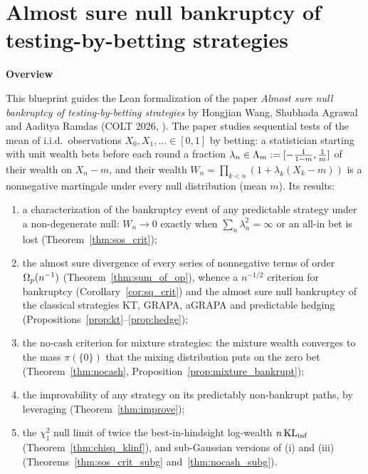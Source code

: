 
\part{Almost sure null bankruptcy of testing-by-betting strategies}
\label{part:main}

\textbf{Overview}

This blueprint guides the Lean formalization of the paper \emph{Almost sure null bankruptcy of
testing-by-betting strategies} by Hongjian Wang, Shubhada Agrawal and Aaditya Ramdas (COLT 2026,
\cite{wang2026almost}). The paper studies sequential tests of the mean of i.i.d.\ observations
$X_0, X_1, \dots \in [0,1]$ by betting: a statistician starting with unit wealth bets before each
round a fraction $\lambda_n \in \Lambda_m := [-\frac{1}{1-m}, \frac1m]$ of their wealth on $X_n - m$,
and their wealth $W_n = \prod_{k < n} (1 + \lambda_k (X_k - m))$ is a nonnegative martingale under
every null distribution (mean $m$). Its results:
\begin{enumerate}
  \item[(i)] a characterization of the bankruptcy event of any predictable strategy under a
        non-degenerate null: $W_n \to 0$ exactly when $\sum_n \lambda_n^2 = \infty$ or an all-in bet
        is lost (Theorem~\ref{thm:sos_crit});
  \item[(ii)] the almost sure divergence of every series of nonnegative terms of order
        $\Omega_p(n^{-1})$ (Theorem~\ref{thm:sum_of_op}), whence a $n^{-1/2}$ criterion for bankruptcy
        (Corollary~\ref{cor:sq_crit}) and the almost sure null bankruptcy of the classical
        strategies KT, GRAPA, aGRAPA and predictable hedging
        (Propositions~\ref{prop:kt}--\ref{prop:hedge});
  \item[(iii)] the no-cash criterion for mixture strategies: the mixture wealth converges to the
        mass $\pi(\{0\})$ that the mixing distribution puts on the zero bet
        (Theorem~\ref{thm:nocash}, Proposition~\ref{prop:mixture_bankrupt});
  \item[(iv)] the improvability of any strategy on its predictably non-bankrupt paths, by
        leveraging (Theorem~\ref{thm:improve});
  \item[(v)] the $\chi^2_1$ null limit of twice the best-in-hindsight log-wealth $n \operatorname{KL}_{\inf}$
        (Theorem~\ref{thm:chisq_klinf}), and sub-Gaussian versions of (i) and (iii)
        (Theorems~\ref{thm:sos_crit_subg} and~\ref{thm:nocash_subg}).
\end{enumerate}

